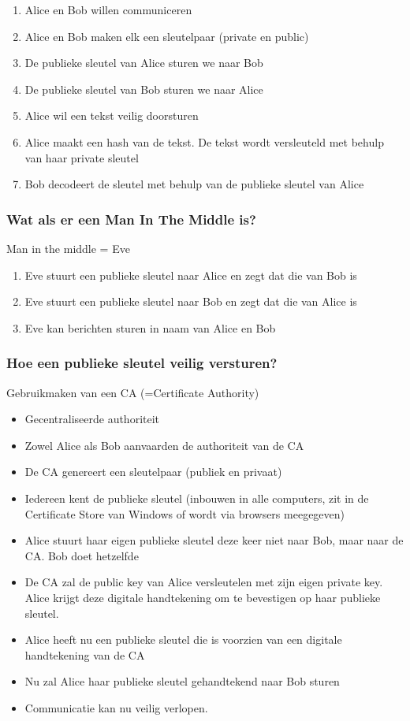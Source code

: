 \documentclass{article}
\begin{document}
\begin{enumerate}
    \item Alice en Bob willen communiceren
    \item Alice en Bob maken elk een sleutelpaar (private en public)
    \item De publieke sleutel van Alice sturen we naar Bob
    \item De publieke sleutel van Bob sturen we naar Alice
    \item Alice wil een tekst veilig doorsturen
    \item Alice maakt een hash van de tekst. De tekst wordt versleuteld met behulp van haar private sleutel
    \item Bob decodeert de sleutel met behulp van de publieke sleutel van Alice
\end{enumerate}

\subsubsection{Wat als er een Man In The Middle is?}

Man in the middle = Eve

\begin{enumerate}
    \item Eve stuurt een publieke sleutel naar Alice en zegt dat die van Bob is
    \item Eve stuurt een publieke sleutel naar Bob en zegt dat die van Alice is
    \item Eve kan berichten sturen in naam van Alice en Bob
\end{enumerate}

\subsubsection{Hoe een publieke sleutel veilig versturen?}

Gebruikmaken van een CA (=Certificate Authority)

\begin{itemize}
    \item Gecentraliseerde authoriteit
    \item Zowel Alice als Bob aanvaarden de authoriteit van de CA
    \item De CA genereert een sleutelpaar (publiek en privaat)
    \item Iedereen kent de publieke sleutel (inbouwen in alle computers, zit in de Certificate Store van Windows of wordt via browsers meegegeven)
    \item Alice stuurt haar eigen publieke sleutel deze keer niet naar Bob, maar naar de CA. Bob doet hetzelfde
    \item De CA zal de public key van Alice versleutelen met zijn eigen private key. Alice krijgt deze digitale handtekening om te bevestigen op haar publieke sleutel.
    \item Alice heeft nu een publieke sleutel die is voorzien van een digitale handtekening van de CA
    \item Nu zal Alice haar publieke sleutel gehandtekend naar Bob sturen
    \item Communicatie kan nu veilig verlopen.
\end{itemize}
\end{document}
